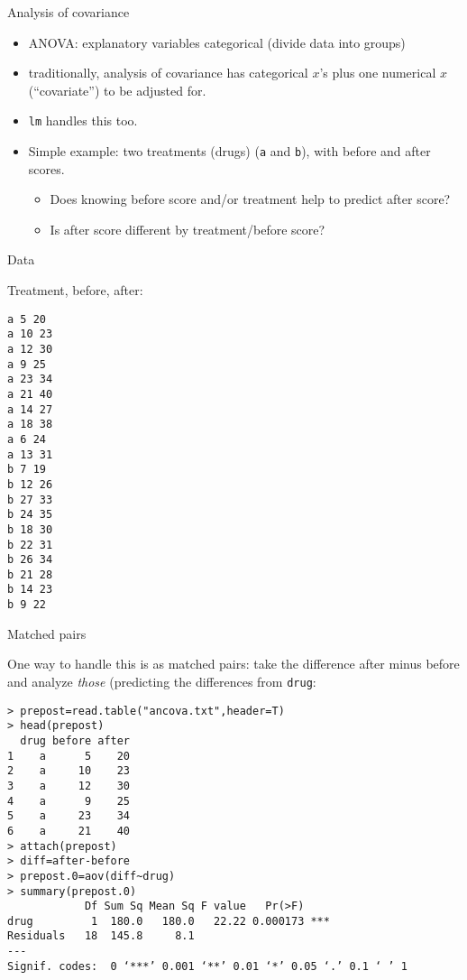 \documentclass[pdf]{prosper}
\begin{document}
\begin{slide}{Analysis of covariance}

  \begin{itemize}
  \item ANOVA: explanatory variables categorical (divide data into groups)
  \item traditionally, analysis of covariance has categorical $x$'s plus one numerical $x$ (``covariate'') to be adjusted for.
  \item \texttt{lm} handles this too.
  \item Simple example: two treatments (drugs) (\verb-a- and \verb-b-), with before and after scores. 
    \begin{itemize}
    \item 
Does knowing before score and/or treatment help to predict after score?
\item Is after score different by treatment/before score?
    \end{itemize}
  \end{itemize}

\end{slide}

\begin{slide}{Data}

Treatment, before, after:

{\scriptsize
\begin{verbatim}
a 5 20
a 10 23
a 12 30
a 9 25
a 23 34
a 21 40
a 14 27
a 18 38
a 6 24
a 13 31
b 7 19
b 12 26
b 27 33
b 24 35
b 18 30
b 22 31
b 26 34
b 21 28
b 14 23
b 9 22
\end{verbatim}
  }
\end{slide}

\begin{slide}[fragile]{Matched pairs}

One way to handle this is as matched pairs: take the difference after
minus before and analyze \emph{those} (predicting the differences from
\texttt{drug}:

{\small
\begin{verbatim}
> prepost=read.table("ancova.txt",header=T)
> head(prepost)
  drug before after
1    a      5    20
2    a     10    23
3    a     12    30
4    a      9    25
5    a     23    34
6    a     21    40
> attach(prepost)
> diff=after-before
> prepost.0=aov(diff~drug)
> summary(prepost.0)
            Df Sum Sq Mean Sq F value   Pr(>F)    
drug         1  180.0   180.0   22.22 0.000173 ***
Residuals   18  145.8     8.1                     
---
Signif. codes:  0 ‘***’ 0.001 ‘**’ 0.01 ‘*’ 0.05 ‘.’ 0.1 ‘ ’ 1 
\end{verbatim}
}
  
\end{slide}
\end{document}
